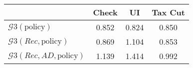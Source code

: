 \begin{tabular}{@{}lccc@{}} 
\toprule 
                          & Check      & UI    & Tax Cut    \\  \midrule 
$\mathcal{G}3(\text{policy})$ & 0.852  & 0.824  & 0.850     \\ 
$\mathcal{G}3(Rec,\text{policy})$ & 0.869  & 1.104  & 0.853     \\ 
$\mathcal{G}3(Rec, AD,\text{policy})$ & 1.139  & 1.414  & 0.992     \\ 
\end{tabular}  
